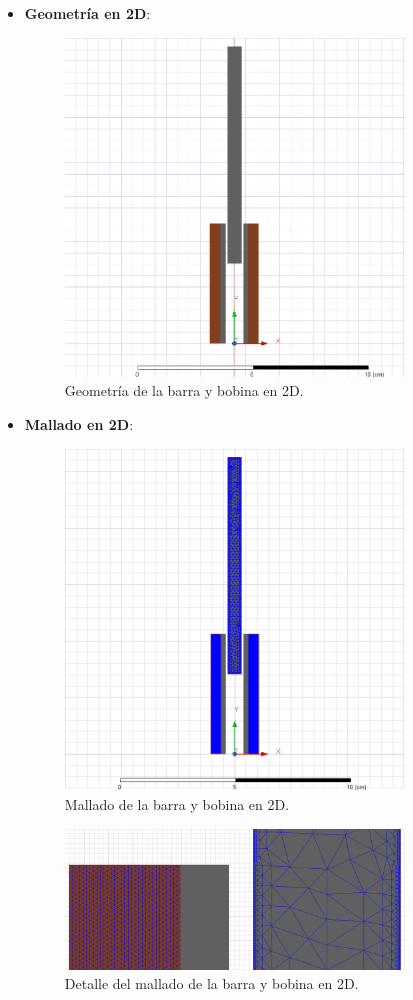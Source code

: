 \begin{itemize}
    \item \textbf{Geometría en 2D}:
    \begin{figure}[H]
        \centering
        \includegraphics[width=9cm]{FigurasMemoria/BarGeom.png}
        \caption{Geometría de la barra y bobina en 2D.}
        \label{fig:BarGeom} %
    \end{figure}
    \item \textbf{Mallado en 2D}:
    \begin{figure}[H]
        \centering
        \includegraphics[width=9cm]{FigurasMemoria/BarGeomMesh.png}
        \caption{Mallado de la barra y bobina en 2D.}
        \label{fig:BarGeomMesh} %
    \end{figure}
    \begin{figure}[H]
        \centering
        \includegraphics[width=9cm]{FigurasMemoria/BarMeshDetail.png}
        \caption{Detalle del mallado de la barra y bobina en 2D.}
        \label{fig:GeomMeshDetail} %
    \end{figure}
\end{itemize}

